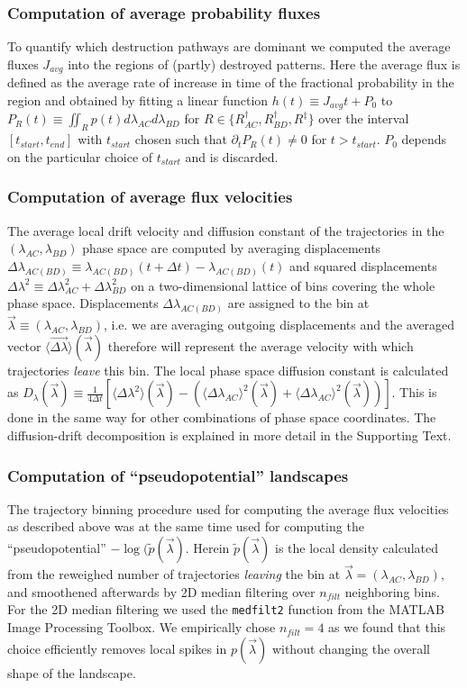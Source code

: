 \documentclass[a4paper,10pt]{article}
\newcommand{\vecA}[1]{\vec{#1}}
\newcommand{\SI}{Supporting Text\xspace}
\begin{document}
\subsubsection*{Computation of average probability fluxes}
To quantify which destruction pathways are dominant we computed the average fluxes $J_{avg}$ into the regions of (partly) destroyed patterns.
Here the average flux is defined as the average rate of increase in time of the fractional probability in the region and
obtained by fitting a linear function $h(t)\equiv J_{avg} t + P_0$ to $P_R(t) \equiv \iint_R p(t) d\lambda_{AC} d\lambda_{BD}$
for $R \in \{R^\dagger_{AC}, R^\dagger_{BD}, R^\ddagger \}$ over the interval $[t_{start},t_{end}]$ with $t_{start}$ chosen such that $\partial_t P_R(t)\neq0$ for $t>t_{start}$.
$P_0$ depends on the particular choice of $t_{start}$ and is discarded.

\subsubsection*{Computation of average flux velocities}
The average local drift velocity and diffusion constant of the trajectories in the $(\lambda_{AC},\lambda_{BD})$ phase space
are computed by averaging displacements $\Delta \lambda_{AC(BD)}\equiv\lambda_{AC(BD)}(t+\Delta t)-\lambda_{AC(BD)}(t)$
and squared displacements $\Delta \lambda^2 \equiv \Delta \lambda_{AC}^2 + \Delta \lambda_{BD}^2$ on a two-dimensional lattice of bins
covering the whole phase space.
Displacements $\Delta \lambda_{AC(BD)}$ are assigned to the bin at $\vecA{\lambda} \equiv (\lambda_{AC}, \lambda_{BD})$,
i.e. we are averaging outgoing displacements and the averaged vector $\langle\vecA{\Delta\lambda}\rangle (\vecA{\lambda})$ 
therefore will represent the average velocity with which trajectories \emph{leave} this bin.
The local phase space diffusion constant is calculated as
$D_\lambda (\vecA{\lambda}) \equiv \frac{1}{4\Delta t} \left[ \langle\Delta \lambda^2\rangle (\vecA{\lambda})
  - \left( \langle\Delta\lambda_{AC}\rangle^2 (\vecA{\lambda}) + \langle\Delta\lambda_{AC}\rangle^2 (\vecA{\lambda}) \right) \right]$.
This is done in the same way for other combinations of phase space coordinates.
The diffusion-drift decomposition is explained in more detail in the \SI.

\subsubsection*{Computation of ``pseudopotential'' landscapes}
The trajectory binning procedure used for computing the average flux velocities as described above was at the same time used for computing the ``pseudopotential'' $-\log(\tilde p(\vecA \lambda)$. Herein $\tilde p(\vecA \lambda)$ is the local density calculated from the reweighed number of trajectories \emph{leaving} the bin at $\vecA \lambda = (\lambda_{AC},\lambda_{BD})$, and smoothened afterwards by 2D median filtering over $n_{filt}$ neighboring bins. For the 2D median filtering we used the \texttt{medfilt2} function from the MATLAB Image Processing Toolbox. We empirically chose $n_{filt}=4$ as we found that this choice efficiently removes local spikes in $p(\vecA \lambda)$ without changing the overall shape of the landscape.
\end{document}
